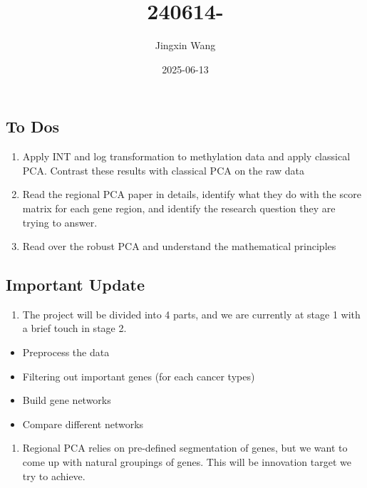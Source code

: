 \documentclass[
]{article}
\title{240614-}
\author{Jingxin Wang}
\date{2025-06-13}
\providecommand{\tightlist}{%
  \setlength{\itemsep}{0pt}\setlength{\parskip}{0pt}}
\begin{document}
\maketitle

\subsection{To Dos}\label{to-dos}

\begin{enumerate}
\def\labelenumi{\arabic{enumi}.}
\tightlist
\item
  Apply INT and log transformation to methylation data and apply
  classical PCA. Contrast these results with classical PCA on the raw
  data
\item
  Read the regional PCA paper in details, identify what they do with the
  score matrix for each gene region, and identify the research question
  they are trying to answer.
\item
  Read over the robust PCA and understand the mathematical principles
\end{enumerate}

\subsection{Important Update}\label{important-update}

\begin{enumerate}
\def\labelenumi{\arabic{enumi}.}
\tightlist
\item
  The project will be divided into 4 parts, and we are currently at
  stage 1 with a brief touch in stage 2.
\end{enumerate}

\begin{itemize}
\tightlist
\item
  Preprocess the data
\item
  Filtering out important genes (for each cancer types)
\item
  Build gene networks
\item
  Compare different networks
\end{itemize}

\begin{enumerate}
\def\labelenumi{\arabic{enumi}.}
\setcounter{enumi}{1}
\tightlist
\item
  Regional PCA relies on pre-defined segmentation of genes, but we want
  to come up with natural groupings of genes. This will be innovation
  target we try to achieve.
\end{enumerate}
\end{document}
